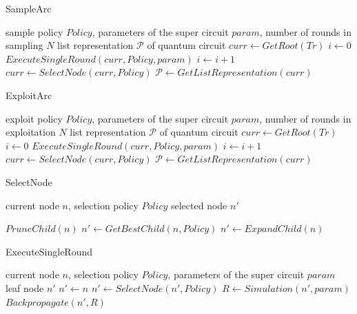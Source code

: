 \documentclass[a4paper,onecolumn,11pt]{quantumarticle}
\begin{document}
\begin{algorithm}
\caption{SampleArc}\label{alg:sampleArc}
\begin{algorithmic}
\Require sample policy $Policy$, parameters of the super circuit $param$, number of rounds in sampling $N$
\Ensure list representation $\mathcal{P}$ of quantum circuit
\State $curr \gets GetRoot(Tr)$ 
\State $i\gets0$ 
\State $ExecuteSingleRound(curr, Policy, param)$
\State $i\gets i+1$
\EndWhile
{}
\State $curr\gets SelectNode(curr, Policy)$
\EndWhile
\State $\mathcal{P}\gets GetListRepresentation(curr)$
\end{algorithmic}
\end{algorithm}

\begin{algorithm}[H]
\caption{ExploitArc}\label{alg:exploitArc}
\begin{algorithmic}
\Require exploit policy $Policy$, parameters of the super circuit $param$, number of rounds in exploitation $N$
\Ensure list representation $\mathcal{P}$ of quantum circuit
\State $curr \gets GetRoot(Tr)$ 
\State $i\gets0$ 
\State $ExecuteSingleRound(curr, Policy, param)$
\State $i\gets i+1$
\EndWhile
\State $curr\gets SelectNode(curr, Policy)$
\EndWhile
\State $\mathcal{P}\gets GetListRepresentation(curr)$
\end{algorithmic}
\end{algorithm}

\begin{algorithm}
\caption{SelectNode}\label{alg:selectChild}
\begin{algorithmic}
\Require current node $n$, selection policy $Policy$
\Ensure selected node $n'$

    \State $PruneChild(n)$ 
    \State $n' \gets GetBestChild(n, Policy)$  
\Else
    \State $n' \gets ExpandChild(n)$ 
\EndIf
\end{algorithmic}
\end{algorithm}

\begin{algorithm}[H]
\caption{ExecuteSingleRound}\label{alg:executeSingleRound}
\begin{algorithmic}
\Require current node $n$, selection policy $Policy$, parameters of the super circuit $param$
\Ensure leaf node $n'$
\State $n'\gets n$
\State $n'\gets SelectNode(n', Policy)$
\EndWhile
\State $R \gets Simulation(n', param)$  
\State $Backpropagate(n', R)$ 
\end{algorithmic}
\end{algorithm}
\end{document}
